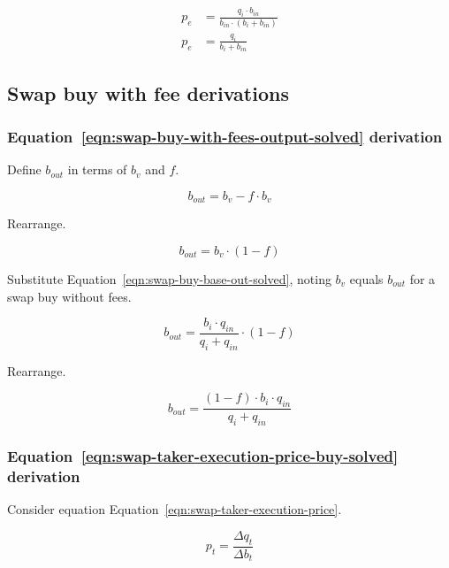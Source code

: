 \documentclass[table, twocolumn]{article}
\begin{document}
\begin{align}
	p_e & = \frac{q_i \cdot b_{in}}{b_{in} \cdot (b_i + b_{in})} \nonumber \\
	p_e & = \frac{q_i}{b_i + b_{in}} \nonumber
\end{align}

\subsection{Swap buy with fee  derivations}\label{ssec:swap-buy-with-fee-derivations}

\subsubsection{Equation~\ref{eqn:swap-buy-with-fees-output-solved} derivation}%
\label{sssec:equation-eqn-swap-buy-with-fees-output-solved-derivation}

Define $b_{out}$ in terms of $b_v$ and $f$.

\begin{equation}
  b_{out} = b_v - f \cdot b_v \nonumber
\end{equation}

Rearrange.

\begin{equation}
  b_{out} = b_v \cdot (1 - f) \nonumber
\end{equation}

Substitute Equation~\ref{eqn:swap-buy-base-out-solved}, noting $b_v$ equals $b_{out}$
for a swap buy without fees.

\begin{equation}
  b_{out} = \frac{b_i \cdot q_{in}}{q_i + q_{in}} \cdot (1 - f) \nonumber
\end{equation}

Rearrange.

\begin{equation}
  b_{out} = \frac{(1 - f) \cdot b_i \cdot q_{in}}{q_i + q_{in}} \nonumber
\end{equation}

\subsubsection{Equation~\ref{eqn:swap-taker-execution-price-buy-solved} derivation}%
\label{sssec:equation-eqn-swap-taker-execution-price-buy-solved-derivation}

Consider equation Equation~\ref{eqn:swap-taker-execution-price}.

\begin{equation}
  p_t = \frac{\Delta q_t}{\Delta b_t}
\end{equation}
\end{document}
